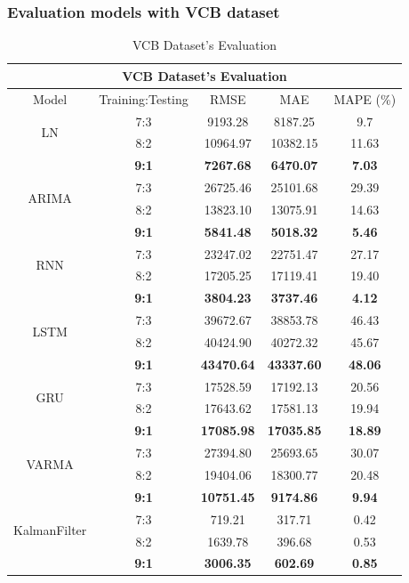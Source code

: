 \subsubsection{Evaluation models with VCB dataset}
\begin{table}[H]
    \centering
    \caption{VCB Dataset's Evaluation}
    \begin{tabular}{|c|c|c|c|c|}
         \hline
         \multicolumn{5}{|c|}{\textbf{VCB Dataset's Evaluation}}\\
         \hline
         \centering Model & Training:Testing & RMSE & MAE & MAPE (\%)\\
         \hline
         \multirow{2}{*}{LN} & 7:3 & 9193.28&8187.25&9.7 \\ & 8:2 & 10964.97&10382.15&11.63 \\ & \textbf{9:1} & \textbf{7267.68} & \textbf{6470.07} & \textbf{7.03}\\
         \hline
         \multirow{2}{*}{ARIMA} & 7:3 & 26725.46&25101.68&29.39\\ & 8:2 & 13823.10&13075.91&14.63 \\ & \textbf{9:1} & \textbf{5841.48} & \textbf{5018.32} & \textbf{5.46}\\
         \hline
         \multirow{2}{*}{RNN} & 7:3 & 23247.02&22751.47&27.17\\ & 8:2 & 17205.25&17119.41&19.40\\ & \textbf{9:1} & \textbf{3804.23} & \textbf{3737.46} & \textbf{4.12}\\
         \hline
         \multirow{2}{*}{LSTM} & 7:3 & 39672.67&38853.78&46.43\\ & 8:2 & 40424.90&40272.32&45.67 \\ & \textbf{9:1} & \textbf{43470.64} & \textbf{43337.60} & \textbf{48.06}\\
         \hline
         \multirow{2}{*}{GRU} & 7:3 & 17528.59&17192.13&20.56\\ & 8:2 & 17643.62&17581.13&19.94 \\ & \textbf{9:1} & \textbf{17085.98} & \textbf{17035.85} & \textbf{18.89}\\
         \hline
         \multirow{2}{*}{VARMA} & 7:3 & 27394.80&25693.65&30.07\\ & 8:2 & 19404.06&18300.77&20.48 \\ & \textbf{9:1} & \textbf{10751.45} & \textbf{9174.86} & \textbf{9.94}\\       
         \hline
         \multirow{2}{*}{KalmanFilter} & 7:3 & 719.21&317.71&0.42\\ & 8:2 & 1639.78&396.68&0.53 \\ & \textbf{9:1} & \textbf{3006.35} & \textbf{602.69} & \textbf{0.85}\\

\end{tabular}
\end{table}
